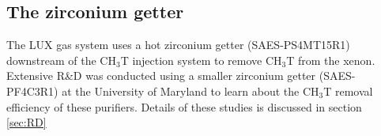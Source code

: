 \subsection{The zirconium getter}

The LUX gas system uses a hot zirconium getter (SAES-PS4MT15R1) downstream of the CH$_3$T injection system to remove CH$_3$T from the xenon.  Extensive R\&D was conducted using a smaller zirconium getter (SAES-PF4C3R1) at the University of Maryland to learn about the CH$_3$T removal efficiency of these purifiers.  Details of these studies is discussed in section \ref{sec:RD} 